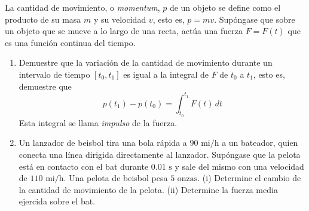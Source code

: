 \item La cantidad de movimiento, o \textit{momentum}, $p$ de un objeto se define como el producto de su masa $m$ y su velocidad $v$, esto es, $p = mv$. Supóngase que sobre un objeto que se mueve a lo largo de una recta, actúa una fuerza $F = F(t)$ que es una función continua del tiempo.
\begin{enumerate}
    \item[(a)] Demuestre que la variación de la cantidad de movimiento durante un intervalo de tiempo $[t_0, t_1]$ es igual a la integral de $F$ de $t_0$ a $t_1$, esto es, demuestre que
    $$p(t_1) - p(t_0) = \int_{t_0}^{t_1} F(t) \, dt$$
    Esta integral se llama \textit{impulso} de la fuerza.
    \item[(b)] Un lanzador de beisbol tira una bola rápida a $90 \text{ mi/h}$ a un bateador, quien conecta una línea dirigida directamente al lanzador. Supóngase que la pelota está en contacto con el bat durante $0.01 \text{ s}$ y sale del mismo con una velocidad de $110 \text{ mi/h}$. Una pelota de beisbol pesa $5 \text{ onzas}$.
    (i) Determine el cambio de la cantidad de movimiento de la pelota.
    (ii) Determine la fuerza media ejercida sobre el bat.
\end{enumerate}
